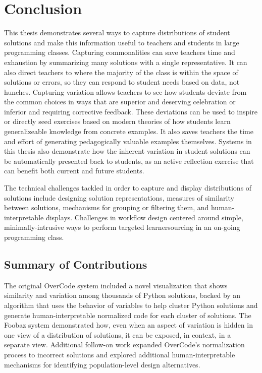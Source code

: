 \chapter{Conclusion}\label{chapter:conclusion}

This thesis demonstrates several ways to capture distributions of student solutions and make this information useful to teachers and students in large programming classes. Capturing commonalities can save teachers time and exhaustion by summarizing many solutions with a single representative. It can also direct teachers to where the majority of the class is within the space of solutions or errors, so they can respond to student needs based on data, not hunches. Capturing variation allows teachers to see how students deviate from the common choices in ways that are superior and deserving celebration or inferior and requiring corrective feedback. These deviations can be used to inspire or directly seed exercises based on modern theories of how students learn generalizeable knowledge from concrete examples. It also saves teachers the time and effort of generating pedagogically valuable examples themselves. Systems in this thesis also demonstrate how the inherent variation in student solutions can be automatically presented back to students, as an active reflection exercise that can benefit both current and future students. 

The technical challenges tackled in order to capture and display distributions of solutions include designing solution representations, measures of similarity between solutions, mechanisms for grouping or filtering them, and human-interpretable displays. Challenges in workflow design centered around simple, minimally-intrusive ways to perform targeted learnersourcing in an on-going programming class.

\section{Summary of Contributions}

The original OverCode system included a novel visualization that shows similarity and variation among thousands of Python solutions, backed by an algorithm that uses the behavior of variables to help cluster Python solutions and generate human-interpretable normalized code for each cluster of solutions. The Foobaz system demonstrated how, even when an aspect of variation is hidden in one view of a distribution of solutions, it can be exposed, in context, in a separate view. Additional follow-on work expanded OverCode's normalization process to incorrect solutions and explored additional human-interpretable mechanisms for identifying population-level design alternatives.

